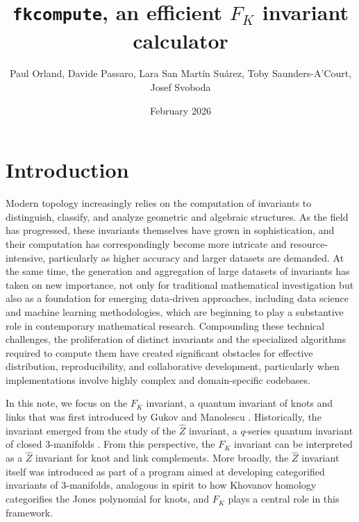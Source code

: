 \documentclass[twocolumn]{article}
\title{\texttt{fkcompute}, an efficient $F_K$ invariant calculator}
\author{Paul Orland, Davide Passaro, Lara San Mart\'in Su\'arez, Toby Saunders-A'Court, Josef Svoboda}
\date{February 2026}
\begin{document}
\maketitle
\tableofcontents

\section{Introduction}

Modern topology increasingly relies on the computation of invariants to distinguish, classify, and analyze geometric and algebraic structures.
As the field has progressed, these invariants themselves have grown in sophistication, and their computation has correspondingly become more intricate and resource-intensive, particularly as higher accuracy and larger datasets are demanded.
At the same time, the generation and aggregation of large datasets of invariants has taken on new importance, not only for traditional mathematical investigation but also as a foundation for emerging data-driven approaches, including data science and machine learning methodologies, which are beginning to play a substantive role in contemporary mathematical research.
Compounding these technical challenges, the proliferation of distinct invariants and the specialized algorithms required to compute them have created significant obstacles for effective distribution, reproducibility, and collaborative development, particularly when implementations involve highly complex and domain-specific codebases.

In this note, we focus on the $F_K$ invariant, a quantum invariant of knots and links that was first introduced by Gukov and Manolescu \cite{GM}.
Historically, the invariant emerged from the study of the $\widehat{Z}$ invariant, a $q$-series quantum invariant of closed 3-manifolds \cite{GPV,GPPV}.
From this perspective, the $F_K$ invariant can be interpreted as a $\widehat{Z}$ invariant for knot and link complements. 
More broadly, the $\widehat{Z}$ invariant itself was introduced as part of a program aimed at developing categorified invariants of 3-manifolds, analogous in spirit to how Khovanov homology categorifies the Jones polynomial for knots, and $F_K$ plays a central role in this framework.
\end{document}
